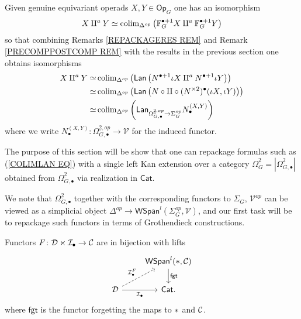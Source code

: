 \documentclass[a4paper,10pt]{article}%
\begin{document}
Given genuine equivariant operads 
$X,Y \in \mathsf{Op}_G$
one has an isomorphism
\[
	X \amalg^a Y 
\simeq
	\operatorname{colim}_{\Delta^{op}} 
	\left(
	\mathbb{F}_G^{\bullet+1} X \amalg^a \mathbb{F}_G^{\bullet+1} Y
	\right)
\]
so that combining Remarks \ref{REPACKAGERES REM}
and
Remark \ref{PRECOMPPOSTCOMP REM}
with the results in the previous section one obtains isomorphisms
\begin{align}
	X \amalg^a Y  
\simeq &
	\operatorname{colim}_{\Delta^{op}} 
	\left(
	\mathsf{Lan} \left(
	N^{\bullet+1} \iota X \amalg^a N^{\bullet+1} \iota Y
	\right) \right)
\\
\simeq &
	\operatorname{colim}_{\Delta^{op}} 
	\left(
	\mathsf{Lan} \left(
	N \circ \amalg \circ (N^{\times 2})^{\bullet} (\iota X,\iota Y)
	\right) \right)
\\ \label{COLIMLAN EQ}
\simeq &
	\operatorname{colim}_{\Delta^{op}} 
	\left(
	\mathsf{Lan}_{\Omega_{G,\bullet}^{\underline{2},op} \to \Sigma_G^{op}}
	N_{\bullet}^{(X,Y)}
	\right)
\end{align}
where we write 
$N_{\bullet}^{(X,Y)} \colon \Omega_{G,\bullet}^{\underline{2},op} \to \mathcal{V}$
for the induced functor.

The purpose of this section will be show that one can repackage 
formulas such as (\ref{COLIMLAN EQ})
with a single left Kan extension over a category
$\Omega_G^{\underline{2}} = |\Omega_{G,\bullet}^{\underline{2}}|$
obtained from 
$\Omega_{G,\bullet}^{\underline{2}}$
via realization in $\mathsf{Cat}$.

We note that $\Omega_{G,\bullet}^{\underline{2}}$ together with the corresponding functors to $\Sigma_G$, $\mathcal{V}^{op}$
can be viewed as a simplicial object 
$\Delta^{op} \to \mathsf{WSpan}^l(\Sigma_G^{op},\mathcal{V})$,
and our first task will be to repackage such functors in terms of Grothendieck constructions.


\begin{lemma}\label{SIMPSPANREIN LEMMA}
Functors $F \colon \mathcal{D} \ltimes \mathcal{I}_{\bullet} \to \mathcal{C}$ are in bijection with lifts
\[
\begin{tikzcd}
    & \mathsf{WSpan}^l(\**,\C) \ar{d}{\mathsf{fgt}} \\
\mathcal{D} \ar{r}[swap]{\mathcal{I}_{\bullet}} \ar[dashed]{ru}{\mathcal{I}_{\bullet}^F} & \mathsf{Cat}.
\end{tikzcd}
\]
where $\mathsf{fgt}$ is the functor forgetting the maps to $\**$ and $\mathcal{C}$.
\end{lemma}
\end{document}
